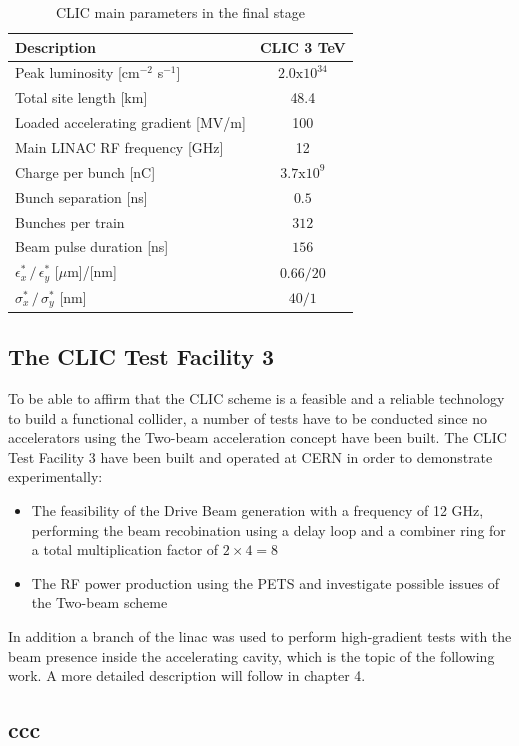 \begin{table}[h]
  \centering
    \begin{tabular}{ l c  }
    \hline
    \hline
    \textbf{Description}						& \textbf{CLIC 3 TeV}	\\
    \hline
    Peak luminosity [cm$^{-2}$ s$^{-1}$]			& $2.0\text{x}10^{34}$	\\
    Total site length [km]						& 48.4				\\
    Loaded accelerating gradient [MV/m]			& 100	\\
    Main LINAC RF frequency	[GHz]			& 12	\\
    Charge per bunch [nC]						& $3.7\text{x}10^{9}$ \\
    Bunch separation [ns]						& $0.5$ \\
    Bunches per train							& $312$ \\
    Beam pulse duration [ns]					& $156$ \\
    $\epsilon^*_x \, / \, \epsilon^*_y$ [$\mu$m]/[nm]	& $0.66/20$ \\  
    $\sigma^*_x\, / \, \sigma^*_y$ [nm]			& $40/1$	\\
    
    \hline
    \hline
    \end{tabular}
  \caption{CLIC main parameters in the final stage}
\label{table_CLIC_params}
\end{table}







\subsection[CTF3]{The CLIC Test Facility 3}

To be able to affirm that the CLIC scheme is a feasible and a reliable technology to build a functional collider, a number of tests have to be conducted since no accelerators using the Two-beam acceleration concept have been built. The CLIC Test Facility 3 have been built and operated at CERN in order to demonstrate experimentally:

\begin{itemize}
\item The feasibility of the Drive Beam generation with a frequency of 12 GHz, performing the beam recobination using a delay loop and a combiner ring for a total multiplication factor of $2\times4 =8$
\item The RF power production using the PETS and investigate possible issues of the Two-beam scheme
\end{itemize}
In addition a branch of the linac was used to perform high-gradient tests with the beam presence inside the accelerating cavity, which is the topic of the following work. A more detailed description will follow in chapter 4.




\subsection{ccc}

